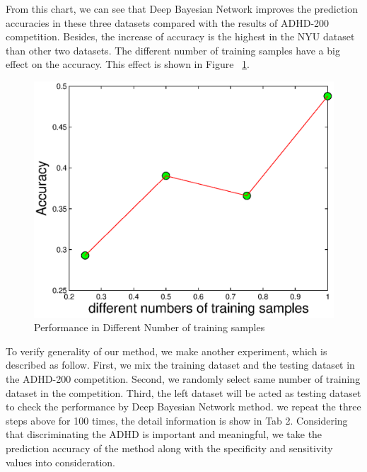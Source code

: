 \documentclass[10pt,twocolumn,letterpaper]{article}
\begin{document}
From this chart, we can see that Deep Bayesian Network improves the prediction accuracies  in these three datasets  compared with the results of ADHD-200 competition. Besides, the increase of accuracy is the highest in the NYU dataset than other two datasets. The different number of training samples have a big effect on the accuracy. This effect is shown in Figure ~\ref{fig:Number}.
\begin{figure}[ht]
\begin{center}
   \includegraphics[width=0.8\linewidth]{Figures/Number.eps}
\end{center}
   \caption{Performance in Different Number of training samples}
\label{fig:Number}
\end{figure}



To verify generality of our method, we make another experiment, which is described as follow. First, we mix the training dataset and the testing dataset in the ADHD-200 competition. Second, we randomly select same number of training dataset in the competition. Third, the left dataset will be acted as testing dataset to check the performance by Deep Bayesian Network method. we repeat the three steps above for 100 times, the detail information is show in Tab 2. Considering that discriminating the ADHD is important and meaningful, we take the prediction accuracy of the method along with the specificity and sensitivity values into consideration.

\end{document}
